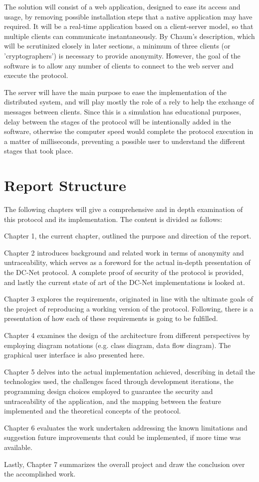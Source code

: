 The solution will consist of a web application, designed to ease its access and usage, by removing possible installation steps that a native application may have required. It will be a real-time application based on a client-server model, so that multiple clients can communicate instantaneously. By Chaum's description, which will be scrutinized closely in later sections, a minimum of three clients (or 'cryptographers') is necessary to provide anonymity. However, the goal of the software is to allow any number of clients to connect to the web server and execute the protocol.

The server will have the main purpose to ease the implementation of the distributed system, and will play mostly the role of a rely to help the exchange of messages between clients. 
Since this is a simulation has educational purposes, delay between the stages of the protocol will be intentionally added in the software, otherwise the computer speed would complete the protocol execution in a matter of milliseconds, preventing a possible user to understand the different stages that took place.


\section{Report Structure}
The following chapters will give a comprehensive and in depth examination of this protocol and its implementation. The content is divided as follows:

Chapter 1, the current chapter, outlined the purpose and direction of the report.

Chapter 2 introduces background and related work in terms of anonymity and untraceability, which serves as a foreword for the actual in-depth presentation of the DC-Net protocol. A complete proof of security of the protocol is provided, and lastly the current state of art of the DC-Net implementations is looked at.

Chapter 3 explores the requirements, originated in line with the ultimate goals of the project of reproducing a working version of the protocol. Following, there is a presentation of how each of these requirements is going to be fulfilled. 

Chapter 4 examines the design of the architecture from different perspectives by employing diagram notations (e.g. class diagram, data flow diagram). The graphical user interface is also presented here.

Chapter 5 delves into the actual implementation achieved, describing in detail the technologies used, the challenges faced through development iterations, the programming design choices employed to guarantee the security and untraceability of the application, and the mapping between the feature implemented and the theoretical concepts of the protocol.

Chapter 6 evaluates the work undertaken addressing the known limitations and suggestion future improvements that could be implemented, if more time was available.

Lastly, Chapter 7 summarizes the overall project and draw the conclusion over the accomplished work.